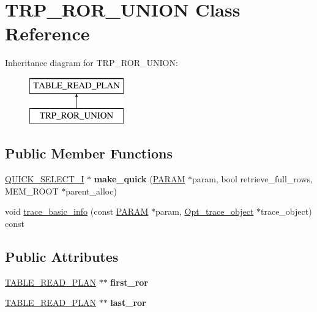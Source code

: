 \hypertarget{classTRP__ROR__UNION}{}\section{T\+R\+P\+\_\+\+R\+O\+R\+\_\+\+U\+N\+I\+ON Class Reference}
\label{classTRP__ROR__UNION}
Inheritance diagram for T\+R\+P\+\_\+\+R\+O\+R\+\_\+\+U\+N\+I\+ON\+:\begin{figure}[H]
\begin{center}
\leavevmode
\includegraphics[height=2.000000cm]{classTRP__ROR__UNION}
\end{center}
\end{figure}
\subsection*{Public Member Functions}
\begin{DoxyCompactItemize}
\item 
\mbox{\label{classTRP__ROR__UNION_a4d5339564eb02a93d21e3fc17166404c}} 
\mbox{\hyperlink{classQUICK__SELECT__I}{Q\+U\+I\+C\+K\+\_\+\+S\+E\+L\+E\+C\+T\+\_\+I}} $\ast$ {\bfseries make\+\_\+quick} (\mbox{\hyperlink{classPARAM}{P\+A\+R\+AM}} $\ast$param, bool retrieve\+\_\+full\+\_\+rows, M\+E\+M\+\_\+\+R\+O\+OT $\ast$parent\+\_\+alloc)
\item 
void \mbox{\hyperlink{classTRP__ROR__UNION_abbb6e6faf397eac6302db5d9c07c2ac9}{trace\+\_\+basic\+\_\+info}} (const \mbox{\hyperlink{classPARAM}{P\+A\+R\+AM}} $\ast$param, \mbox{\hyperlink{classOpt__trace__object}{Opt\+\_\+trace\+\_\+object}} $\ast$trace\+\_\+object) const
\end{DoxyCompactItemize}
\subsection*{Public Attributes}
\begin{DoxyCompactItemize}
\item 
\mbox{\label{classTRP__ROR__UNION_aa2ae997b5131c953970e399a6770b9db}} 
\mbox{\hyperlink{classTABLE__READ__PLAN}{T\+A\+B\+L\+E\+\_\+\+R\+E\+A\+D\+\_\+\+P\+L\+AN}} $\ast$$\ast$ {\bfseries first\+\_\+ror}
\item 
\mbox{\label{classTRP__ROR__UNION_a328e59520e5461d7e1362a6da0fda01b}} 
\mbox{\hyperlink{classTABLE__READ__PLAN}{T\+A\+B\+L\+E\+\_\+\+R\+E\+A\+D\+\_\+\+P\+L\+AN}} $\ast$$\ast$ {\bfseries last\+\_\+ror}
\end{DoxyCompactItemize}
